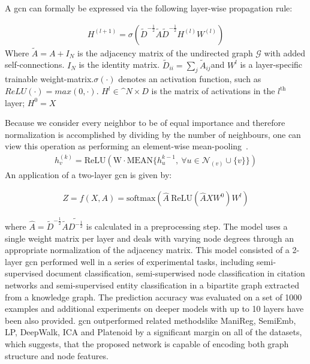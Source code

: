 A \acf{gcn} can formally be expressed via the following layer-wise propagation rule:

\begin{align*}
    H^{(l+1)} = \sigma (\tilde{D}^{-\frac{1}{2}}\tilde{A}\tilde{D}^{-\frac{1}{2}} H^{(l)}W^{(l)})
\end{align*}
Where $\tilde{A} = A + I_{N}$ is the adjacency matrix of the undirected graph $\mathcal{G}$
with added self-connections. $I_{N}$ is the identity matrix. $\tilde{D}_{ii} = \sum_{j}\tilde{A}_{ij}$and
$W^{l}$ is a layer-specific trainable weight-matrix.$\sigma(\cdot)$ denotes an activation function, such
as $ReLU(\cdot) = max(0, \cdot)$. $ H^{l}\in  \mathbb^{N \times D}$ is the matrix of activations in the
$l^{\mathrm{th}}$ layer; $H^{0}= X$

Because we consider every neighbor to be of equal importance and therefore normalization is accomplished
by dividing by the number of neighbours, one can view this operation as performing an element-wise
mean-pooling~\cite{Xu2019}.
\begin{align*}
    h_{v}^{(k)} = \mathrm{ReLU}(\mathrm{W} \cdot\mathrm{MEAN} \{h_{u}^{k-1},\ \forall{u} \in \mathcal{N}_{(v)} \cup \{v\}\})
\end{align*}
An application of a two-layer \ac{gcn} is given by:

\begin{align*}
    Z = f(X,A) = \mathrm{softmax} (\hat{A}\ \mathrm{ReLU}(\hat{A}XW^{0})W^{l})
\end{align*}

where $\hat{A} = \tilde{D}^{-\frac{1}{2}}\tilde{A}\tilde{D^{-\frac{1}{2}}}$
is calculated in a preprocessing step. The model uses a single weight matrix per layer and
deals with varying node degrees through an appropriate normalization of the adjacency matrix.
This model consisted of a 2-layer \ac{gcn} performed well in a series of experimental tasks, including semi-supervised document classification, semi-superwised node classification in citation networks and semi-supervised entity classification in a bipartite graph extracted from a knowledge graph.
The prediction accuracy was evaluated on a set of 1000 examples and additional experiments on deeper models with up to 10 layers have been also provided. \ac{gcn} outperformed related methodslike ManiReg, SemiEmb, LP, DeepWalk, ICA and Platenoid by a significant margin on all of the datasets, which suggests, that the proposed
network is capable of encoding both graph structure and node features.

